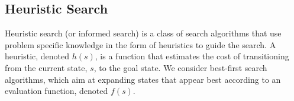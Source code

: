 



\subsection{Heuristic Search}
Heuristic search (or informed search) is a class of search algorithms that use problem specific knowledge in the form of heuristics to guide the search. A heuristic, denoted $h(s)$, is a function that estimates the cost of transitioning from the current state, $s$, to the goal state. We consider best-first search algorithms, which aim at expanding states that appear best according to an evaluation function, denoted $f(s)$. 
